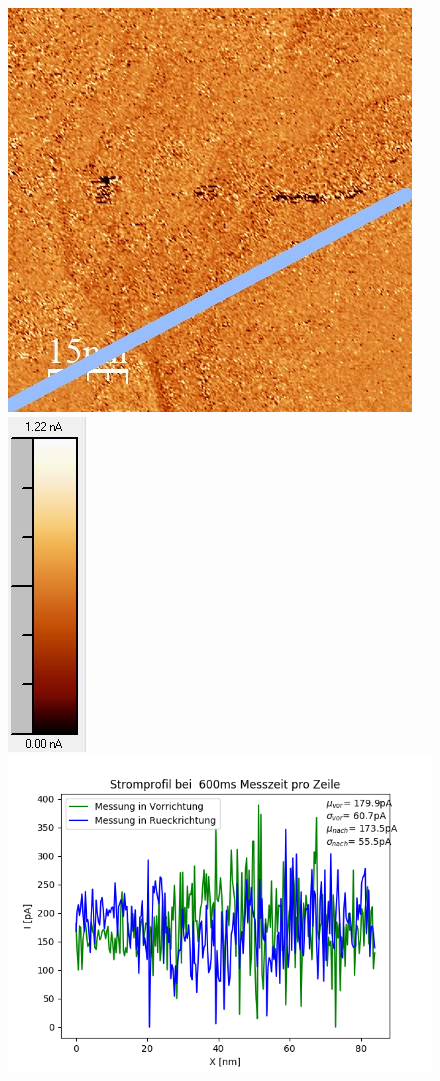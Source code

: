 \documentclass[12pt,a4paper]{article}
\begin{document}
\begin{figure}[H]
\includegraphics[scale=0.6]{Bilder/Anhang/Zeit/Strom/0_6_Zeit_nach_Strom.jpg}
\includegraphics[scale=0.6]{Bilder/Anhang/Zeit/Strom/0_6_Zeit_nach_Strom_Skala.jpg}
\includegraphics[scale=0.5]{Bilder/Anhang/Zeit/Strom/Strom_Profil_Zeit_0600.png}

\end{figure}
\end{document}
